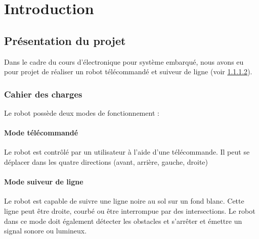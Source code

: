 \chapter{Introduction}

\section{Présentation du projet}

Dans le cadre du cours d'électronique pour système embarqué,
nous avons eu pour projet de réaliser un robot télécommandé et suiveur de ligne (voir \ref{Mode suiveur de ligne}).

\subsection{Cahier des charges}

Le robot possède deux modes de fonctionnement :

\subsubsection{Mode télécommandé}

Le robot est contrôlé par un utilisateur à l'aide d'une télécommande.
Il peut se déplacer dans les quatre directions (avant, arrière, gauche, droite)

\subsubsection{Mode suiveur de ligne} \label{Mode suiveur de ligne}

Le robot est capable de suivre une ligne noire au sol sur un fond blanc.
Cette ligne peut être droite, courbé ou être interrompue par des intersections.
Le robot dans ce mode doit également détecter les obstacles et s'arrêter et émettre un signal sonore ou lumineux.

